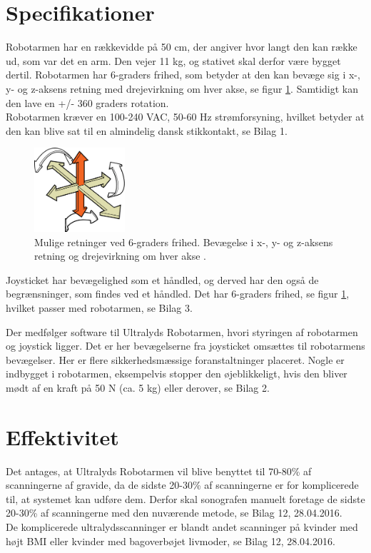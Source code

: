 \newpage
\section{Specifikationer}
Robotarmen har en rækkevidde på 50 cm, der angiver hvor langt den kan række ud, som var det en arm. Den vejer 11 kg, og stativet skal derfor være bygget dertil. Robotarmen har 6-graders frihed, som betyder at den kan bevæge sig i x-, y- og z-aksens retning med drejevirkning om hver akse, se figur \ref{seksgradersfrihed}. Samtidigt kan den lave en +/- 360 graders rotation. \\
Robotarmen kræver en 100-240 VAC, 50-60 Hz strømforsyning, hvilket betyder at den kan blive sat til en almindelig dansk stikkontakt, se Bilag 1.
\begin{figure}[H]\centering
	\includegraphics[width = 0.3\textwidth]{Figurer/sixDegressOfFreedom.jpg}
	\caption{Mulige retninger ved 6-graders frihed. Bevægelse i x-, y- og z-aksens retning og drejevirkning om hver akse \cite{6gradersfrihed}. }
	\label{seksgradersfrihed}
\end{figure}
Joysticket har bevægelighed som et håndled, og derved har den også de begrænsninger, som findes ved et håndled. Det har 6-graders frihed, se figur \ref{seksgradersfrihed}, hvilket passer med robotarmen, se Bilag 3. 

Der medfølger software til Ultralyds Robotarmen, hvori styringen af robotarmen og joystick ligger. Det er her bevægelserne fra joysticket omsættes til robotarmens bevægelser. Her er flere sikkerhedsmæssige foranstaltninger placeret. Nogle er indbygget i robotarmen, eksempelvis stopper den øjeblikkeligt, hvis den bliver mødt af en kraft på 50 N (ca. 5 kg) eller derover, se Bilag 2.    

\section{Effektivitet}
Det antages, at Ultralyds Robotarmen vil blive benyttet til 70-80\% af scanningerne af gravide, da de sidste 20-30\% af scanningerne er for komplicerede til, at systemet kan udføre dem. Derfor skal sonografen manuelt foretage de sidste 20-30\% af scanningerne med den nuværende metode, se Bilag 12, 28.04.2016. \\ 
De komplicerede ultralydsscanninger er blandt andet scanninger på kvinder med højt BMI eller kvinder med bagoverbøjet livmoder, se Bilag 12, 28.04.2016. 
 
